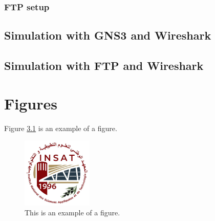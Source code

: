 \documentclass[12pt,a4paper,oneside,english]{book}
\begin{document}
{\subsection {FTP setup}
\section {Simulation with GNS3 and Wireshark }
\subsection{}
\subsection{}
\section {Simulation with FTP and Wireshark }
\subsection{}
\subsection{}

\chapter{Figures}
Figure \ref{fig:exemple1} is an example of a figure.
\begin{figure}[!h]
\centering
\includegraphics[width=0.3\textwidth]{images/INSAT.jpg}
\caption{This is an example of a figure.}
\label{fig:exemple1}
\end{figure}

}
\end{document}
